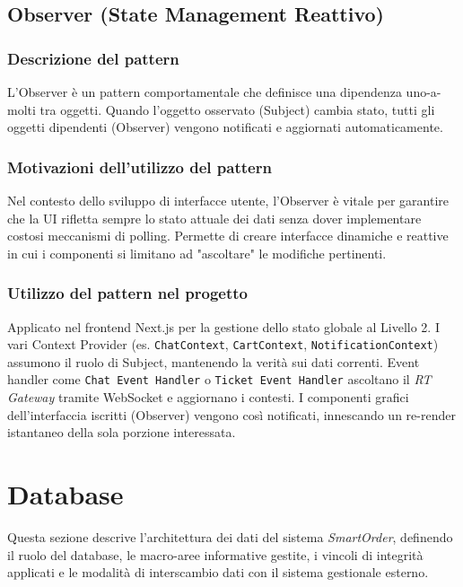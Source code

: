 \documentclass[a4paper, 11pt, oneside]{scrartcl}
\begin{document}
\subsection{Observer (State Management Reattivo)}

\subsubsection{Descrizione del pattern}
L'Observer è un pattern comportamentale che definisce una dipendenza uno-a-molti tra oggetti. Quando l'oggetto osservato (Subject) cambia stato, tutti gli oggetti dipendenti (Observer) vengono notificati e aggiornati automaticamente.

\subsubsection{Motivazioni dell'utilizzo del pattern}
Nel contesto dello sviluppo di interfacce utente, l'Observer è vitale per garantire che la UI rifletta sempre lo stato attuale dei dati senza dover implementare costosi meccanismi di polling. Permette di creare interfacce dinamiche e reattive in cui i componenti si limitano ad "ascoltare" le modifiche pertinenti.

\subsubsection{Utilizzo del pattern nel progetto}
Applicato nel frontend Next.js per la gestione dello stato globale al Livello 2. I vari Context Provider (es. \texttt{ChatContext}, \texttt{CartContext}, \texttt{NotificationContext}) assumono il ruolo di Subject, mantenendo la verità sui dati correnti. Event handler come \texttt{Chat Event Handler} o \texttt{Ticket Event Handler} ascoltano il \textit{RT Gateway} tramite WebSocket e aggiornano i contesti. I componenti grafici dell'interfaccia iscritti (Observer) vengono così notificati, innescando un re-render istantaneo della sola porzione interessata.

\newpage
\section{Database}

Questa sezione descrive l'architettura dei dati del sistema \textit{SmartOrder}, definendo il ruolo del database, le macro-aree informative gestite, i vincoli di integrità applicati e le modalità di interscambio dati con il sistema gestionale esterno.
\end{document}
